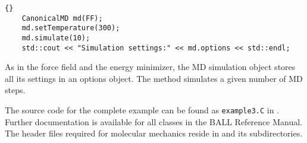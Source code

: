 \begin{lstlisting}{}
	CanonicalMD md(FF);
	md.setTemperature(300);
	md.simulate(10);
	std::cout << "Simulation settings:" << md.options << std::endl;
\end{lstlisting}

\noindent
As in the force field and the energy minimizer, the MD simulation object
stores all its settings in an options object. The
 method simulates a given number of MD
steps. 

The source code for the complete example can be found as {\tt example3.C}
in . Further documentation is available for all
classes in the BALL Reference Manual. The header files required for molecular
mechanics reside in  and its subdirectories.
